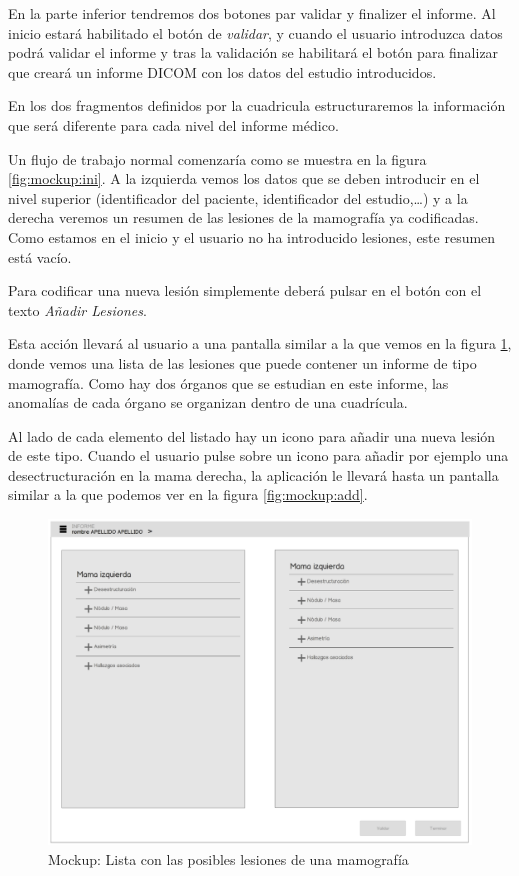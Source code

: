 En la parte inferior tendremos dos botones par validar y finalizer el informe. Al inicio estará habilitado el botón de \emph{validar}, y cuando el usuario introduzca datos podrá validar el informe y tras la validación se habilitará el botón para finalizar que creará un informe DICOM con los datos del estudio introducidos.\par
En los dos fragmentos definidos por la cuadricula estructuraremos la información que será diferente para cada nivel del informe médico.\medskip\par
Un flujo de trabajo normal comenzaría como se muestra en la figura \ref{fig:mockup:ini}. A la izquierda vemos los datos que se deben introducir en el nivel superior (identificador del paciente, identificador del estudio,\ldots) y a la derecha veremos un resumen de las lesiones de la mamografía ya codificadas. Como estamos en el inicio y el usuario no ha introducido lesiones, este resumen está vacío.\par
Para codificar una nueva lesión simplemente deberá pulsar en el botón con el texto \emph{Añadir Lesiones}.\medskip\par

Esta acción llevará al usuario a una pantalla similar a la que vemos en la figura \ref{fig:mockup:tree}, donde vemos una lista de las lesiones que puede contener un informe de tipo mamografía. Como hay dos órganos que se estudian en este informe, las anomalías de cada órgano se organizan dentro de una cuadrícula.\par
Al lado de cada elemento del listado hay un icono para añadir una nueva lesión de este tipo. Cuando el usuario pulse sobre un icono para añadir por ejemplo una desectructuración en la mama derecha, la aplicación le llevará hasta un pantalla similar a la que podemos ver en la figura \ref{fig:mockup:add}.\medskip \par

\begin{figure}[ht]
\centering
\includegraphics[page=1,scale=0.4]{./imgs/mockup/mockup.pdf}
\caption{Mockup: Lista con las posibles lesiones de una mamografía}
\label{fig:mockup:tree}
\end{figure}

